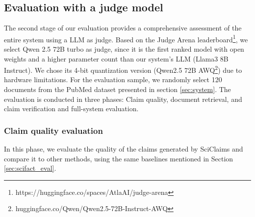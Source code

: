 \documentclass[11pt]{article}
\begin{document}
\subsection{Evaluation with a judge model}
\label{sec:judge}
The second stage of our evaluation provides a comprehensive assessment of the entire system using a LLM as judge. Based on the Judge Arena leaderboard\footnote{https://huggingface.co/spaces/AtlaAI/judge-arena}, we select Qwen 2.5 72B turbo as judge, since it is the first ranked model with open weights and a higher parameter count than our system's LLM (Llama3 8B Instruct). We chose its 4-bit quantization version (Qwen2.5 72B AWQ\footnote{huggingface.co/Qwen/Qwen2.5-72B-Instruct-AWQ}) due to hardware limitations. For the evaluation sample, we randomly select 120 documents from the PubMed dataset presented in section \ref{sec:system}. The evaluation is conducted in three phases: Claim quality, document retrieval, and claim verification and full-system evaluation.

\subsubsection{Claim quality evaluation}

In this phase, we evaluate the quality of the claims generated by SciClaims and compare it to other methods, using the same baselines mentioned in Section \ref{sec:scifact_eval}.

\begin{table}[ht]
\footnotesize
\centering
{}
\caption{Claim extraction (phase 1) evaluation results with a judge model (Qwen2.5 72B AWQ).}
\label{table:phase1_results}
\end{table}
\end{document}
